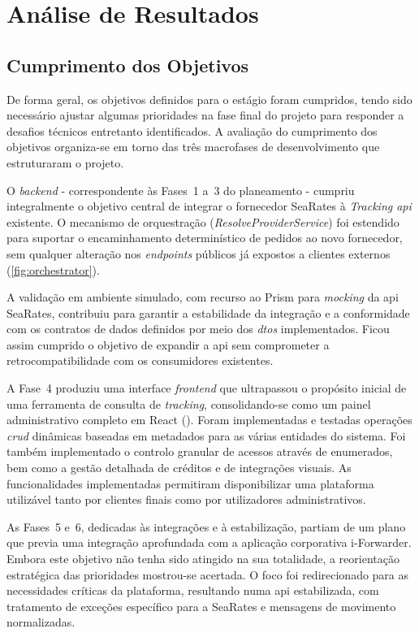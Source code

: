 ﻿%
\chapter{Análise de Resultados}\label{chap:analise}

\section{Cumprimento dos Objetivos}\label{sec:cumprimento}

De forma geral, os objetivos definidos para o estágio foram cumpridos, tendo sido necessário ajustar algumas prioridades na fase final do projeto para responder a desafios técnicos entretanto identificados. A avaliação do cumprimento dos objetivos organiza-se em torno das três macrofases de desenvolvimento que estruturaram o projeto.

O \textit{backend} - correspondente às Fases~1 a~3 do planeamento - cumpriu integralmente o objetivo central de integrar o fornecedor SeaRates à \textit{Tracking \gls{api}} existente. O mecanismo de orquestração (\textit{ResolveProviderService}) foi estendido para suportar o encaminhamento determinístico de pedidos ao novo fornecedor, sem qualquer alteração nos \textit{endpoints} públicos já expostos a clientes externos (\autoref{fig:orchestrator}).

A validação em ambiente simulado, com recurso ao Prism para \textit{mocking} da \gls{api} SeaRates, contribuiu para garantir a estabilidade da integração e a conformidade com os contratos de dados definidos por meio dos \textit{\glspl{dto}} implementados. Ficou assim cumprido o objetivo de expandir a \gls{api} sem comprometer a retrocompatibilidade com os consumidores existentes.

A Fase~4 produziu uma interface \textit{frontend} que ultrapassou o propósito inicial de uma ferramenta de consulta de \textit{tracking}, consolidando-se como um painel administrativo completo em React (). Foram implementadas e testadas operações \textit{\gls{crud}} dinâmicas baseadas em metadados para as várias entidades do sistema. Foi também implementado o controlo granular de acessos através de enumerados, bem como a gestão detalhada de créditos e de integrações visuais. As funcionalidades implementadas permitiram disponibilizar uma plataforma utilizável tanto por clientes finais como por utilizadores administrativos.

As Fases~5 e~6, dedicadas às integrações e à estabilização, partiam de um plano que previa uma integração aprofundada com a aplicação corporativa i-Forwarder. Embora este objetivo não tenha sido atingido na sua totalidade, a reorientação estratégica das prioridades mostrou-se acertada. O foco foi redirecionado para as necessidades críticas da plataforma, resultando numa \gls{api} estabilizada, com tratamento de exceções específico para a SeaRates e mensagens de movimento normalizadas.

